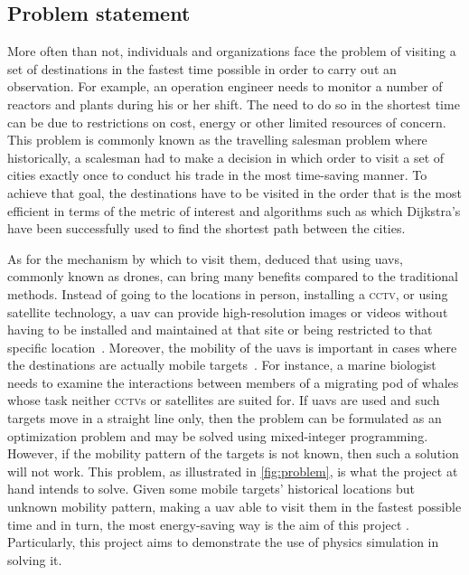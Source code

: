 \documentclass[../main.tex]{subfiles}
\begin{document}
\subsection{Problem statement}

More often than not, individuals and organizations face the problem
of visiting a set of destinations in the fastest time possible
in order to carry out an observation.
For example, an operation engineer needs to monitor
a number of reactors and plants during his or her shift.
The need to do so in the shortest time can be due to restrictions on
cost, energy or other limited resources of concern.
This problem is commonly known as the travelling salesman problem
where historically, a scalesman had to make a decision in which order
to visit a set of cities exactly once to conduct his trade
in the most time-saving manner.
To achieve that goal, the destinations have to be visited in the order
that is the most efficient in terms of the metric of interest
and algorithms such as which Dijkstra's have been successfully used 
to find the shortest path between the cities.

As for the mechanism by which to visit them, 
\textcite{Sha19} deduced that using \glspl{uav}, 
commonly known as drones,
can bring many benefits 
compared to the traditional methods.
Instead of going to the locations in person, installing a \textsc{cctv},
or using satellite technology, a \gls{uav} can provide
high-resolution images or videos without 
having to be installed and maintained at that site
or being restricted to that specific location~\cite{Sha19}.
Moreover, the mobility of the \glspl{uav} is important
in cases where the destinations are actually mobile targets~\cite{Sha19}.
For instance, a marine biologist needs to examine 
the interactions between members of a migrating 
pod of whales whose task neither \textsc{cctv}s 
or satellites are suited for.
If \glspl{uav} are used and such targets move 
in a straight line only,
then the problem can be formulated as 
an optimization problem
and may be solved using mixed-integer programming.
However, if the mobility pattern of the targets is not known,
then such a solution will not work.
This problem, as illustrated in \cref{fig:problem}, 
is what the project at hand intends to solve.
Given some mobile targets' historical locations 
but unknown mobility pattern, making a \gls{uav} able to visit them
in the fastest possible time and in turn, the most energy-saving way is the aim of this project . 
Particularly, this project aims to demonstrate the 
use of physics simulation in solving it. 
\end{document}

